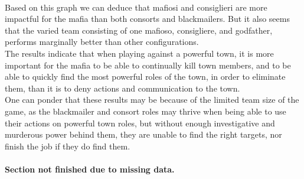 \\Based on this graph we can deduce that mafiosi and consiglieri are more
impactful for the mafia than both consorts and blackmailers. But it also seems
that the varied team consisting of one mafioso, consigliere, and godfather,
performs marginally better than other configurations. \\
The results indicate that when playing against a powerful town, it is more
important for the mafia to be able to continually kill town members, and to be
able to quickly find the most powerful roles of the town, in order to eliminate
them, than it is to deny actions and communication to the town. \\
One can ponder that these results may be because of the limited team size of
the game, as the blackmailer and consort roles may thrive when being able to
use
their actions on powerful town roles, but without enough investigative and
murderous power behind them, they are unable to find the right targets, nor
finish the job if they do find them. \\\\
\textbf{Section not finished due to missing data.}
